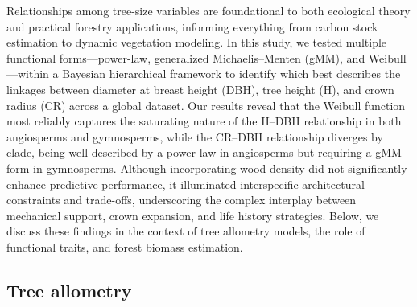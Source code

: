 \documentclass[
  12pt,
  letterpaper,
  DIV=11,
  numbers=noendperiod]{scrartcl}
\begin{document}
Relationships among tree-size variables are foundational to both
ecological theory and practical forestry applications, informing
everything from carbon stock estimation to dynamic vegetation modeling.
In this study, we tested multiple functional forms---power-law,
generalized Michaelis--Menten (gMM), and Weibull---within a Bayesian
hierarchical framework to identify which best describes the linkages
between diameter at breast height (DBH), tree height (H), and crown
radius (CR) across a global dataset. Our results reveal that the Weibull
function most reliably captures the saturating nature of the H--DBH
relationship in both angiosperms and gymnosperms, while the CR--DBH
relationship diverges by clade, being well described by a power-law in
angiosperms but requiring a gMM form in gymnosperms. Although
incorporating wood density did not significantly enhance predictive
performance, it illuminated interspecific architectural constraints and
trade-offs, underscoring the complex interplay between mechanical
support, crown expansion, and life history strategies. Below, we discuss
these findings in the context of tree allometry models, the role of
functional traits, and forest biomass estimation.

\hypertarget{tree-allometry}{%
\subsection{Tree allometry}\label{tree-allometry}}
\end{document}
